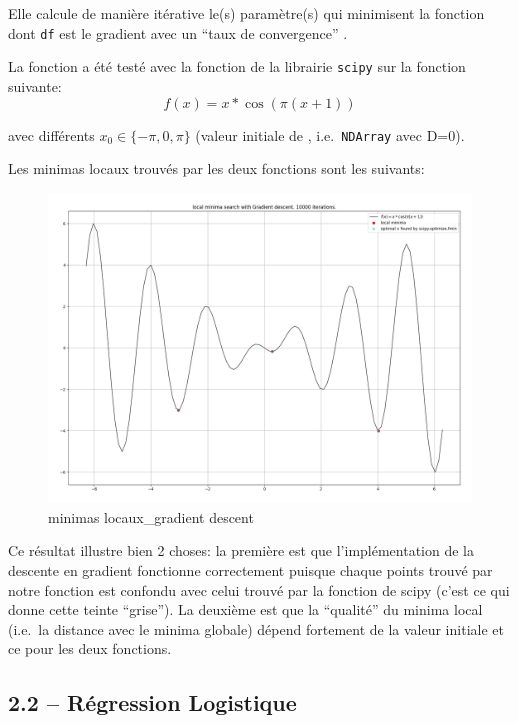 \documentclass[
]{article}
\begin{document}
Elle calcule de manière itérative le(s) paramètre(s)  qui
minimisent la fonction dont \texttt{df} est le gradient avec un ``taux
de convergence'' .

La fonction a été testé avec la fonction 
\cite{ScipyOptimizeFmin} de la librairie \texttt{scipy} sur la fonction
suivante: \[
f(x) = x * \cos(\pi  (x + 1))
\]

avec différents \(x_0 \in \{-\pi, 0, \pi\}\) (valeur initiale de
, i.e.~\texttt{NDArray} avec D=0).

Les minimas locaux trouvés par les deux fonctions sont les suivants:

\begin{figure}
\centering
\includegraphics[width=1\textwidth,height=\textheight]{../res/3.1_gradient_descent_minima.png}
\caption{minimas locaux\_gradient descent}
\end{figure}

Ce résultat illustre bien 2 choses: la première est que l'implémentation
de la descente en gradient fonctionne correctement puisque chaque points
trouvé par notre fonction est confondu avec celui trouvé par la fonction
de scipy (c'est ce qui donne cette teinte ``grise''). La deuxième est
que la ``qualité'' du minima local (i.e.~la distance avec le minima
globale) dépend fortement de la valeur initiale et ce pour les deux
fonctions.

\newpage{}

\hypertarget{ruxe9gression-logistique-1}{%
\subsection{2.2 -- Régression
Logistique}\label{ruxe9gression-logistique-1}}
\end{document}
